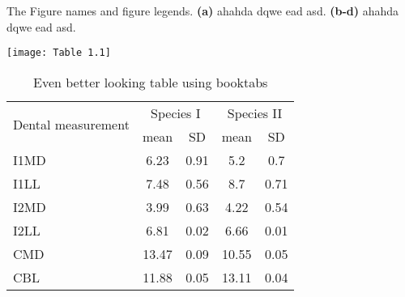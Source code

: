 \begin{table}[htbp!]
  \caption[The name which will be shown on TOC]{The Figure names and figure legends. \textbf{(a)} ahahda dqwe ead asd. \textbf{(b-d)} ahahda dqwe ead asd.}
  \centering
  \texttt{[image: Table 1.1]} %
\end{table}

\lipsum[1]

\begin{table}
\caption{Even better looking table using booktabs}
\centering
\label{table:good_table}
\begin{tabular}{l c c c c}
\toprule
\multirow{2}{*}{Dental measurement} & \multicolumn{2}{c}{Species I} & \multicolumn{2}{c}{Species II} \\
\cmidrule{2-5}
  & mean & SD  & mean & SD  \\
\midrule
I1MD & 6.23 & 0.91 & 5.2  & 0.7  \\

I1LL & 7.48 & 0.56 & 8.7  & 0.71 \\

I2MD & 3.99 & 0.63 & 4.22 & 0.54 \\

I2LL & 6.81 & 0.02 & 6.66 & 0.01 \\

CMD & 13.47 & 0.09 & 10.55 & 0.05 \\

CBL & 11.88 & 0.05 & 13.11 & 0.04\\
\bottomrule
\end{tabular}
\end{table}


